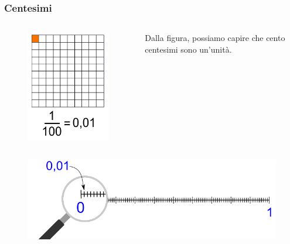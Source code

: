 \documentclass[handout]{beamer}
\theoremstyle{plain}
\begin{document}
\begin{frame}
\frametitle{Centesimi}
\begin{columns}
  \begin{column}{0.3\textwidth}
  \begin{figure}
    \includegraphics[width=\columnwidth]{img/centesimi1.png}
  \end{figure}    
  \end{column}
  \begin{column}{0.6\textwidth}
    Dalla figura, possiamo capire che \alert{cento centesimi sono un'unità}.

    ~
  \end{column}
\end{columns}
\begin{figure}
  \includegraphics[width=.8\columnwidth]{img/centesimi2.png}
\end{figure}
\end{frame}
\end{document}
